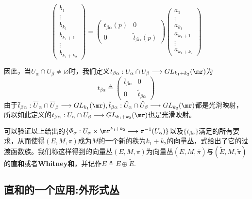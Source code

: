 \[
\left( \begin{array}{cccccc}{b_{1}} \\ {\vdots}  \\ {b_{k_{1}}}\\{b_{k_{1}+1}} \\ {\vdots}  \\ {b_{k_{1}+k_{2}}}  \end{array}\right)=\left( \begin{array}{cc}{\overline{t}_{\beta\alpha}(p)}&{0} \\ {0}&{\tilde{t}_{\beta\alpha}(p)}  \end{array}\right) \left( \begin{array}{cccccc}{a_{1}} \\ {\vdots}  \\ {a_{k_{1}}}\\{a_{k_{1}+1}} \\ {\vdots}  \\ {a_{k_{1}+k_{2}}}  \end{array}\right)
\]

因此，当$U_{\alpha}\cap U_{\beta}\neq\varnothing$时，我们定义$t_{\beta\alpha}:U_{\alpha}\cap U_{\beta}\longrightarrow GL_{k_{1}+k_{2}}(\mr)$为
\begin{equation}
	t_{\beta\alpha}\triangleq\left( \begin{array}{cc}{\overline{t}_{\beta\alpha}}&{0} \\ {0}&{\tilde{t}_{\beta\alpha}}  \end{array}\right)
\end{equation}
由于$\overline{t}_{\beta\alpha}:\overline{U}_{\alpha}\cap \overline{U}_{\beta}\longrightarrow GL_{k_{1}}(\mr),\tilde{t}_{\beta\alpha}:\tilde{U}_{\alpha}\cap \tilde{U}_{\beta}\longrightarrow GL_{k_{2}}(\mr)$都是光滑映射，所以如此定义的$t_{\beta\alpha}:U_{\alpha}\cap U_{\beta}\longrightarrow GL_{k_{1}+k_{2}}(\mr)$也是光滑映射。

可以验证以上给出的$\{\varPhi_{\alpha}:U_{\alpha}\times \mr^{k_{1}+k_{2}} \longrightarrow \pi^{-1}(U_{\alpha})\}$以及$\{ t_{\beta\alpha} \}$满足的所有要求，从而使得$(E,M,\pi)$成为$M$的一个新的秩为$k_{1}+k_{2}$的向量丛，式给出了它的过渡函数族。我们称这样得到的向量丛$(E,M,\pi)$为向量丛$(\overline{E},M,\overline{\pi})$与$(\tilde{E},M,\tilde{\pi})$的\textbf{直和}或者\textbf{Whitney和}，并记作$E\triangleq \overline{E}\oplus \tilde{E}$.

\subsection{直和的一个应用:外形式丛}

